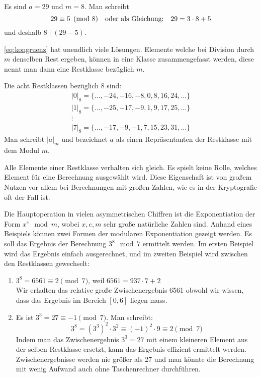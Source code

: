 \begin{example}
  Es sind $a = 29$ und $m = 8$. Man schreibt
  \begin{equation*}
    29 \equiv 5 \pmod{8} \text{\quad oder als Gleichung:\quad} 29 = 3 \cdot 8 + 5
  \end{equation*}
  und deshalb $8 \mid (29 - 5)$.
\end{example}

\noindent
\autoref{eq:kongruenz} hat unendlich viele Lösungen.
Elemente welche bei Division durch $m$ denselben Rest ergeben,
können in eine Klasse zusammengefasst werden, diese nennt man dann eine Restklasse bezüglich $m$.
\begin{example}
  Die acht Restklassen bezüglich 8 sind:
  \begin{gather*}
    \vert0\vert_8 = \{\dots,-24,-16,-8,0,8,16,24,\dots\}\\
    \vert1\vert_8 =\{\dots,-25,-17,-9,1,9,17,25,\dots\}\\
    \vdots\\
    \vert7\vert_8 =\{\dots,-17,-9,-1,7,15,23,31,\dots\}
  \end{gather*}
  Man schreibt $|a|_m$ und bezeichnet $a$ als einen
  Repräsentanten der Restklasse mit dem Modul $m$.
\end{example}

\noindent
Alle Elemente einer Restklasse verhalten sich gleich. Es spielt
keine Rolle, welches Element für eine Berechnung ausgewählt wird.
Diese Eigenschaft ist von großem Nutzen vor allem bei Berechnungen mit großen Zahlen,
wie es in der Kryptografie oft der Fall ist.

\begin{example}
  Die Hauptoperation in vielen asymmetrischen Chiffren ist die Exponentiation der Form
  $x^e \mod{m}$, wobei $x,e,m$ sehr große natürliche Zahlen sind. Anhand eines Beispiels können
  zwei Formen der modularen Exponentiation gezeigt werden. Es soll das Ergebnis der
  Berechnung $3^8 \mod{7}$ ermittelt werden. Im ersten Beispiel wird das Ergebnis einfach
  ausgerechnet, und im zweiten Beispiel wird zwischen den Restklassen gewechselt:
  \begin{enumerate}
    \item $3^8 = 6561 \equiv 2 \pmod{7}$, weil $6561 = 937 \cdot 7 + 2$ \\
          Wir erhalten das relative große Zwischenergebnis 6561 obwohl wir wissen,
          dass das Ergebnis im Bereich $[0, 6]$ liegen muss.
    \item Es ist $3^3 = 27 \equiv -1 \pmod{7}$. Man schreibt:
          \begin{equation*}
            3^8 = (3^3)^2 \cdot 3^2 \equiv (-1)^2 \cdot 9 \equiv 2 \pmod{7}
          \end{equation*}
          Indem man das Zwischenergebnis $3^3 = 27$ mit einem kleineren Element aus der selben
          Restklasse ersetzt, kann das Ergebnis effizient ermittelt werden. Zwischenergebnisse
          werden nie größer als 27 und man könnte die Berechnung mit wenig Aufwand auch ohne
          Taschenrechner durchführen. \qedhere
  \end{enumerate}
\end{example}

